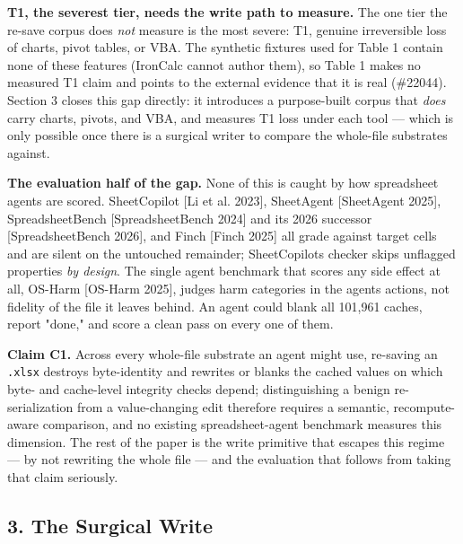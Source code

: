 \documentclass[
]{article}
\newcounter{none} %
\begin{document}
\textbf{T1, the severest tier, needs the write path to measure.} The one
tier the re-save corpus does \emph{not} measure is the most severe: T1,
genuine irreversible loss of charts, pivot tables, or VBA. The synthetic
fixtures used for Table 1 contain none of these features (IronCalc
cannot author them), so Table 1 makes no measured T1 claim and points to
the external evidence that it is real (\#22044). Section 3 closes this
gap directly: it introduces a purpose-built corpus that \emph{does}
carry charts, pivots, and VBA, and measures T1 loss under each tool ---
which is only possible once there is a surgical writer to compare the
whole-file substrates against.

\textbf{The evaluation half of the gap.} None of this is caught by how
spreadsheet agents are scored. SheetCopilot {[}Li et al. 2023{]},
SheetAgent {[}SheetAgent 2025{]}, SpreadsheetBench {[}SpreadsheetBench
2024{]} and its 2026 successor {[}SpreadsheetBench 2026{]}, and Finch
{[}Finch 2025{]} all grade against target cells and are silent on the
untouched remainder; SheetCopilot\textquotesingle s checker skips
unflagged properties \emph{by design}. The single agent benchmark that
scores any side effect at all, OS-Harm {[}OS-Harm 2025{]}, judges harm
categories in the agent\textquotesingle s actions, not fidelity of the
file it leaves behind. An agent could blank all 101,961 caches, report
"done," and score a clean pass on every one of them.

\textbf{Claim C1.} Across every whole-file substrate an agent might use,
re-saving an \texttt{.xlsx} destroys byte-identity and rewrites or
blanks the cached values on which byte- and cache-level integrity checks
depend; distinguishing a benign re-serialization from a value-changing
edit therefore requires a semantic, recompute-aware comparison, and no
existing spreadsheet-agent benchmark measures this dimension. The rest
of the paper is the write primitive that escapes this regime --- by not
rewriting the whole file --- and the evaluation that follows from taking
that claim seriously.

\subsection{3. The Surgical Write}\label{3-the-surgical-write}
\end{document}
